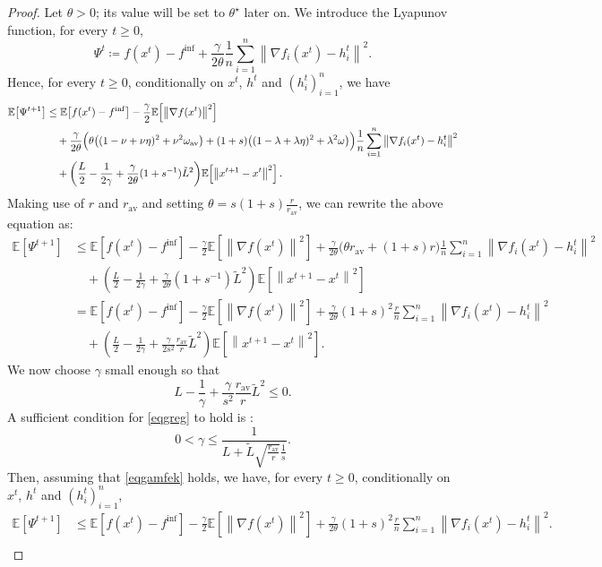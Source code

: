 \documentclass{article} %
\newcommand{\eqdef}{\coloneqq}
\theoremstyle{plain}
\theoremstyle{definition}
\theoremstyle{remark}
\newcommand{\sqnorm}[1]{\left\| #1 \right\|^2}
\newcommand{\Exp}[1]{\mathbb{E}\!\left[ #1 \right]}
\newcommand{\oma}{\omega_{\mathrm{av}}}
\begin{document}
\begin{proof}
   Let $\theta>0$; its value will be set to $\theta^\star$ later on. We introduce the Lyapunov function, for every $t\geq 0$,
   \begin{equation*}
   \Psi^t \eqdef f(x^t)-f^{\inf} + \frac{\gamma}{2\theta}  \frac{1}{n}\sum_{i=1}^n \sqnorm{\nabla f_i(x^t)-h_i^{t}}.
   \end{equation*}
   Hence, for every $t\geq 0$, conditionally on $x^t$, $h^t$ and $(h_i^t)_{i=1}^n$, we have
   \begin{align}
   \Exp{\Psi^{t+1}} &\leq \Exp{f(x^t) - f^{\inf}} - \frac{\gamma}{2} \Exp{\sqnorm{\nabla f(x^t)}}\notag \\
   &\quad +\frac{ \gamma }{2\theta}\Big( \theta\big((1-\nu+\nu\eta)^2+\nu^2\oma\big)\notag+(1+s)\big((1-\lambda+\lambda\eta)^2+\lambda^2\omega\big)
   \Big) \frac{1}{n}\sum_{i=1}^n \sqnorm{\nabla f_i(x^t)-h_i^{t}}\label{eqq1}\\
   &\quad+ \left(\frac{ L}{2}-\frac{1}{2\gamma}+\frac{\gamma}{2\theta}(1+s^{-1})\tilde{L}^2\right)\!\Exp{\sqnorm{x^{t+1}-x^t}}.\notag
   \end{align}
   Making use of $r$ and $r_{\mathrm{av}}$ and setting $\theta = s(1+s)\frac{r}{r_{\mathrm{av}}}$, 
   we can rewrite the above equation as:
   \begin{align*}
   \Exp{\Psi^{t+1}} &\leq \Exp{f(x^t) - f^{\inf}} - \frac{\gamma}{2} \Exp{\sqnorm{\nabla f(x^t)}} +\frac{ \gamma }{2\theta}\Big( \theta r_{\mathrm{av}}
   +(1+s)r
   \Big) \frac{1}{n}\sum_{i=1}^n \sqnorm{\nabla f_i(x^t)-h_i^{t}}\\
   &\quad+ \left(\frac{ L}{2}-\frac{1}{2\gamma}+\frac{\gamma}{2\theta}(1+s^{-1})\tilde{L}^2\right)\!\Exp{\sqnorm{x^{t+1}-x^t}}\\
   &=\Exp{f(x^t) - f^{\inf}} - \frac{\gamma}{2} \Exp{\sqnorm{\nabla f(x^t)}} +\frac{ \gamma }{2\theta} (1+s)^2 
   \frac{r}{n}\sum_{i=1}^n \sqnorm{\nabla f_i(x^t)-h_i^{t}}\\
   &\quad+ \left(\frac{ L}{2}-\frac{1}{2\gamma}+\frac{\gamma}{2s^2}\frac{r_{\mathrm{av}}}{r}\tilde{L}^2\right)\!\Exp{\sqnorm{x^{t+1}-x^t}}.
   \end{align*}
   We now choose $\gamma$ small enough so that 
   \begin{equation}
   L-\frac{1}{\gamma}+\frac{\gamma}{s^2}\frac{r_{\mathrm{av}}}{r}\tilde{L}^2 \leq 0.\label{eqgreg}
   \end{equation}
   A sufficient condition for \eqref{eqgreg} to hold is \citep[Lemma 5]{ric21}:
   \begin{equation}
   0<\gamma \leq \frac{1}{L+\tilde{L}\sqrt{\frac{r_{\mathrm{av}}}{r}}\frac{1}{s}}.\label{eqgamfek}
   \end{equation}
   Then, assuming that \eqref{eqgamfek} holds, we have, for every $t\geq 0$, conditionally on $x^t$, $h^t$ and $(h_i^t)_{i=1}^n$,
   \begin{align*}
   \Exp{\Psi^{t+1}} &\leq \Exp{f(x^t) - f^{\inf}} - \frac{\gamma}{2} \Exp{\sqnorm{\nabla f(x^t)}} +\frac{ \gamma }{2\theta} (1+s)^2 
   \frac{r}{n}\sum_{i=1}^n \sqnorm{\nabla f_i(x^t)-h_i^{t}}.\\
   \end{align*}


\end{proof}
\end{document}
